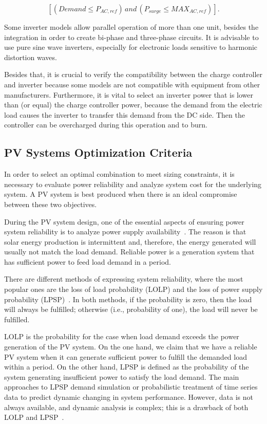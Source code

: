 \begin{equation}
\label{eq:invcheck} 
\left[ (Demand \leq P_{AC,ref}) \, and \, (P_{surge} \leq MAX_{AC,ref}) \right].
\end{equation}

Some inverter models allow parallel operation of more than one unit, besides the integration in order to create bi-phase and three-phase circuits. It is advisable to use pure sine wave inverters, especially for electronic loads sensitive to harmonic distortion waves.

Besides that, it is crucial to verify the compatibility between the charge controller and inverter because some models are not compatible with equipment from other manufacturers. Furthermore, it is vital to select an inverter power that is lower than (or equal) the charge controller power, because the demand from the electric load causes the inverter to transfer this demand from the DC side. Then the controller can be overcharged during this operation and to burn.

\subsection{PV Systems Optimization Criteria}
\label{sec:optcriteria}

In order to select an optimal combination to meet sizing constraints, 
it is necessary to evaluate power reliability and analyze system cost for the underlying system. A PV system is best produced when there is an ideal compromise between these two objectives.

During the PV system design, one of the essential aspects of ensuring power system reliability is to analyze power supply availability~\cite{Alsadi2018}. The reason is that solar energy production is intermittent and, therefore, the energy generated will usually not match the load demand. Reliable power is a generation system that has sufficient power to feed load demand in a period. 

There are different methods of expressing system reliability, where the most popular ones are the loss of load probability (LOLP) and the loss of power supply probability (LPSP)~\cite{Alsadi2018}. In both methods, if the probability is zero, then the load will always be fulfilled; otherwise (i.e., probability of one), the load will never be fulfilled.

LOLP is the probability for the case when load demand exceeds the power generation of the PV system. On the one hand, we claim that we have a reliable PV system when it can generate sufficient power to fulfill the demanded load within a period. On the other hand, LPSP is defined as the probability of the system generating insufficient power to satisfy the load demand. The main approaches to LPSP demand simulation or probabilistic treatment of time series data to predict dynamic changing in system performance. However, data is not always available, and dynamic analysis is complex; this is a drawback of both LOLP and LPSP~\cite{Alsadi2018}.

